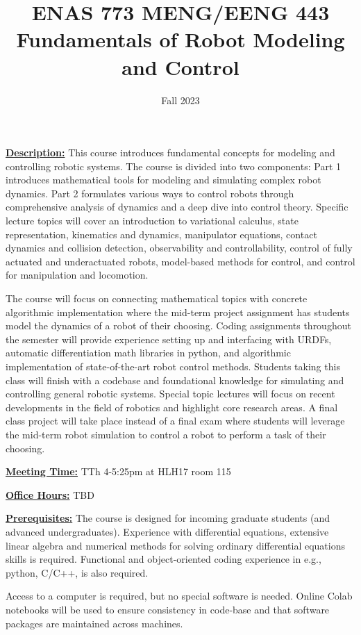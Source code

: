 \documentclass[11pt,letterpaper]{article}
\title{ENAS 773 MENG/EENG 443  \\ Fundamentals of Robot Modeling and Control}
\author{Fall 2023}
\date{}
\newcommand{\mysec}[1]{\medskip\noindent\underline{\textbf{#1}}}
\begin{document}
\maketitle

\mysec{Description:}
This course introduces fundamental concepts for modeling and controlling robotic systems. The course is divided into two components: Part 1 introduces mathematical tools for modeling and simulating complex robot dynamics. Part 2 formulates various ways to control robots through comprehensive analysis of dynamics and a deep dive into control theory.  Specific lecture topics will cover an introduction to variational calculus, state representation, kinematics and dynamics, manipulator equations, contact dynamics and collision detection, observability and controllability, control of fully actuated and underactuated robots, model-based methods for control, and control for manipulation and locomotion. 

The course will focus on connecting mathematical topics with concrete algorithmic implementation where the mid-term project assignment has students model the dynamics of a robot of their choosing. Coding assignments throughout the semester will provide experience setting up and interfacing with URDFs, automatic differentiation math libraries in python, and algorithmic implementation of state-of-the-art robot control methods. Students taking this class will finish with a codebase and foundational knowledge for simulating and controlling general robotic systems. Special topic lectures will focus on recent developments in the field of robotics and highlight core research areas. A final class project will take place instead of a final exam where students will leverage the mid-term robot simulation to control a robot to perform a task of their choosing. 

\mysec{Meeting Time:} TTh 4-5:25pm at HLH17 room 115

\mysec{Office Hours:} TBD

\mysec{Prerequisites:} The course is designed for incoming graduate students (and advanced undergraduates). Experience with differential equations, extensive linear algebra and numerical methods for solving ordinary differential equations skills is required. Functional and object-oriented coding experience in e.g., python, C/C++, is also required.

Access to a computer is required, but no special software is needed. Online Colab notebooks will be used to ensure consistency in code-base and that software packages are maintained across machines. 
\end{document}
